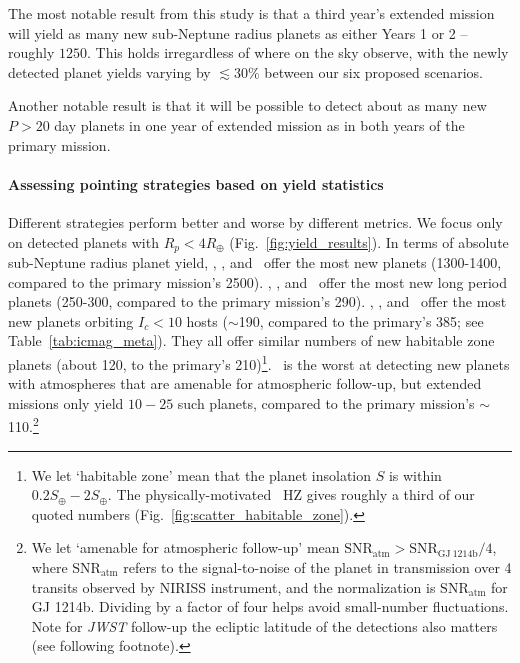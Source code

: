 The most notable result from this study is that a third year's extended mission will yield as many new sub-Neptune radius planets as either Years 1 or 2 -- roughly $1250$.
This holds irregardless of where on the sky observe, with the newly detected planet yields varying by $\lesssim 30\%$ between our six proposed scenarios.

Another notable result is that it will be possible to detect about as many new $P>20$ day planets in one year of \tesss extended mission as in both years of the primary mission.

\paragraph{Assessing pointing strategies based on yield statistics} 
Different strategies perform better and worse by different metrics.
We focus only on detected planets with $R_p<4R_\oplus$ (Fig.~\ref{fig:yield_results}).
In terms of absolute sub-Neptune radius planet yield, \hemis, \npole, and \shemiAvoid\ offer the most new planets (1300-1400, compared to the primary mission's 2500).
\hemis, \npole, and \nhemi\ offer the most new long period planets (250-300, compared to the primary mission's 290).
\hemis, \shemiAvoid, and \eshort\ offer the most new planets orbiting $I_c<10$ hosts ($\sim$190, compared to the primary's 385; see Table~\ref{tab:icmag_meta}).
They all offer similar numbers of new habitable zone planets (about 120, to the primary's 210)\footnote{We let `habitable zone' mean that the planet insolation $S$ is within $0.2S_\oplus-2S_\oplus$. The physically-motivated~\protect\citet{kopparapu_habitable_2013} HZ gives roughly a third of our quoted numbers (Fig.~\protect\ref{fig:scatter_habitable_zone}).}.
\npole\ is the worst at detecting new planets with atmospheres that are amenable for atmospheric follow-up, but extended missions only yield $10-25$ such planets, compared to the primary mission's $\sim$110.\footnote{We let `amenable for atmospheric follow-up' mean $\mathrm{SNR}_\mathrm{atm} > \mathrm{SNR}_\mathrm{GJ\ 1214b}/4 $, where $\mathrm{SNR}_\mathrm{atm}$ refers to the signal-to-noise of the planet in transmission over 4 transits observed by \jwsts NIRISS instrument, and the normalization is $\mathrm{SNR}_\mathrm{atm}$ for GJ 1214b. Dividing by a factor of four helps avoid small-number fluctuations. Note for \textit{JWST} follow-up the ecliptic latitude of the detections also matters (see following footnote).}

